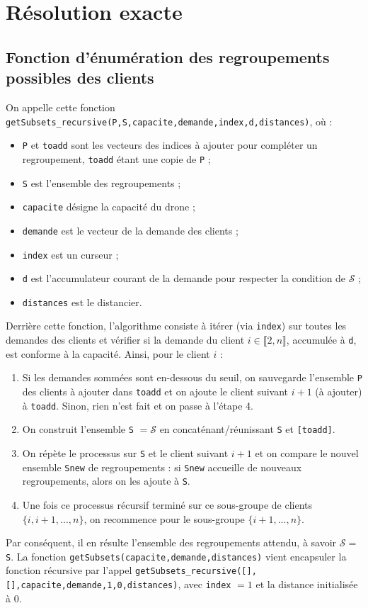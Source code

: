 \documentclass[french, 11pt, a4paper]{article} %
\newcommand{\Sc}{\mathcal{S}} %
\newcommand{\smb}{\smallbreak}
\begin{document}
\section{Résolution exacte}
\subsection{Fonction d'énumération des regroupements possibles des clients}
On appelle cette fonction \texttt{getSubsets\_recursive(P,S,capacite,demande,index,d,distances)},
où : \begin{itemize}
    \item \verb+P+ et \verb+toadd+ sont les vecteurs des indices à ajouter pour compléter un regroupement, \verb+toadd+ étant une copie de \verb+P+ ;
    \item \verb+S+ est l'ensemble des regroupements ;
    \item \verb+capacite+ désigne la capacité du drone ;
    \item \verb+demande+ est le vecteur de la demande des clients ;
    \item \verb+index+ est un curseur ;
    \item \verb+d+ est l'accumulateur courant de la demande pour respecter la condition de $\Sc$ ;
    \item \verb+distances+ est le distancier.
\end{itemize}

Derrière cette fonction, l'algorithme consiste à itérer (via \verb+index+) sur toutes les demandes des clients
et vérifier si la demande du client $i \in \llbracket 2,n \rrbracket$, accumulée à \verb+d+, est conforme à la capacité. Ainsi,
pour le client $i$ : 
\begin{enumerate}
    \item Si les demandes sommées sont en-dessous du seuil, on sauvegarde l'ensemble \verb+P+ des clients à ajouter dans \verb+toadd+
    et on ajoute le client suivant $i+1$ (à ajouter) à \verb+toadd+. Sinon, rien n'est fait et on passe à l'étape 4.
    \item On construit l'ensemble \verb+S+ $= \Sc$ en concaténant/réunissant \verb+S+ et \verb+[toadd]+.
    \item On répète le processus sur \verb+S+ et le client suivant $i+1$ et on compare le nouvel ensemble \verb+Snew+
    de regroupements : si \verb+Snew+ accueille de nouveaux regroupements, alors on les ajoute à \verb+S+.
    \item Une fois ce processus récursif terminé sur ce sous-groupe de clients $\{i,i+1,...,n\}$, on recommence pour le sous-groupe
$\{i+1,...,n\}$.
\end{enumerate}
\smb Par conséquent, il en résulte l'ensemble des regroupements attendu, à savoir $\Sc = $ \verb+S+.
\smb La fonction \texttt{getSubsets(capacite,demande,distances)} vient encapsuler la fonction récursive par l'appel
\texttt{getSubsets\_recursive([],[],capacite,demande,1,0,distances)}, avec \verb+index+ $=1$ et la distance initialisée à $0$.
\end{document}
